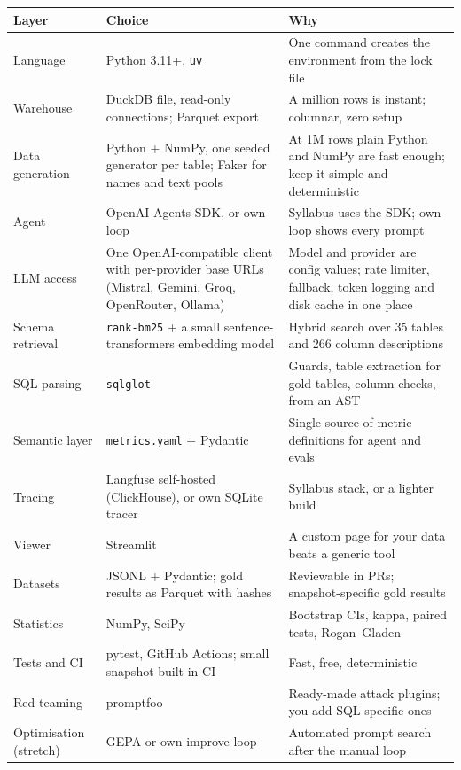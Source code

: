 \documentclass[11pt,a4paper]{article}
\newcommand{\code}[1]{\texttt{\small #1}}
\begin{document}
\begin{center}
\small
\begin{tabularx}{\linewidth}{@{}>{\raggedright\arraybackslash}p{2.9cm} >{\raggedright\arraybackslash}p{5.2cm} >{\raggedright\arraybackslash}X@{}}
\toprule
\textbf{Layer} & \textbf{Choice} & \textbf{Why}\\
\midrule
Language & Python 3.11+, \code{uv} & One command creates the environment from the lock file\\
Warehouse & DuckDB file, read-only connections; Parquet export & A million rows is instant; columnar, zero setup\\
Data generation & Python + NumPy, one seeded generator per table; Faker for names and text pools & At 1M rows plain Python and NumPy are fast enough; keep it simple and deterministic\\
Agent & OpenAI Agents SDK, or own loop & Syllabus uses the SDK; own loop shows every prompt\\
LLM access & One OpenAI-compatible client with per-provider base URLs (Mistral, Gemini, Groq, OpenRouter, Ollama) & Model and provider are config values; rate limiter, fallback, token logging and disk cache in one place\\
Schema retrieval & \code{rank-bm25} + a small sentence-transformers embedding model & Hybrid search over 35 tables and 266 column descriptions\\
SQL parsing & \code{sqlglot} & Guards, table extraction for gold tables, column checks, from an AST\\
Semantic layer & \code{metrics.yaml} + Pydantic & Single source of metric definitions for agent and evals\\
Tracing & Langfuse self-hosted (ClickHouse), or own SQLite tracer & Syllabus stack, or a lighter build\\
Viewer & Streamlit & A custom page for your data beats a generic tool\\
Datasets & JSONL + Pydantic; gold results as Parquet with hashes & Reviewable in PRs; snapshot-specific gold results\\
Statistics & NumPy, SciPy & Bootstrap CIs, kappa, paired tests, Rogan--Gladen\\
Tests and CI & pytest, GitHub Actions; small snapshot built in CI & Fast, free, deterministic\\
Red-teaming & promptfoo & Ready-made attack plugins; you add SQL-specific ones\\
Optimisation (stretch) & GEPA or own improve-loop & Automated prompt search after the manual loop\\
\bottomrule
\end{tabularx}
\end{center}
\end{document}
